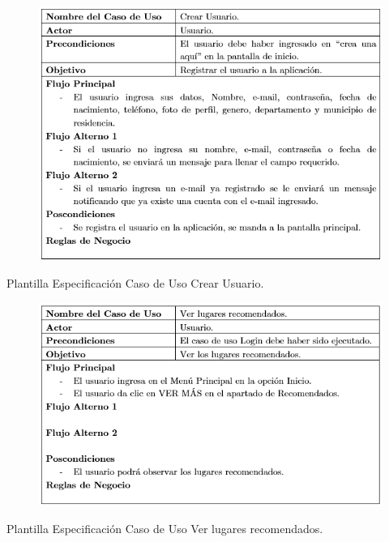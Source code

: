\documentclass[12pt,letterpaper,openany]{book}
\begin{document}
\begin{table}[H]
\begin{center}
\begin{figure}[H]
\begin{center}
\includegraphics[width=13cm]{./imagenes/PCU/crear_usuario}
\end{center}
\end{figure}
\end{center}
\caption{Plantilla Especificación Caso de Uso Crear Usuario.}
\end{table}

\begin{table}[H]
\begin{center}
\begin{figure}[H]
\begin{center}
\includegraphics[width=13cm]{./imagenes/PCU/ver_lugares_recomendados}
\end{center}
\end{figure}
\end{center}
\caption{Plantilla Especificación Caso de Uso Ver lugares recomendados.}
\end{table}
\end{document}
